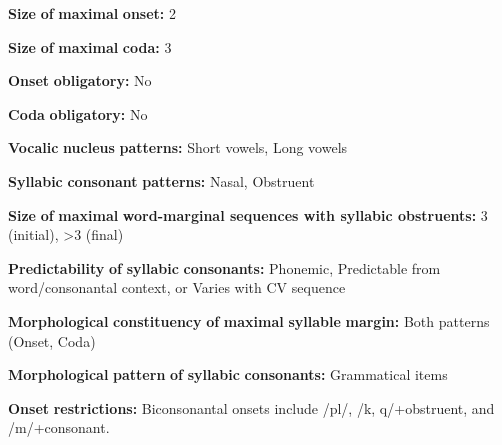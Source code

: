\documentclass[output=paper]{langsci/langscibook}
\begin{document}
\begin{styleBody}
\textbf{Size} \textbf{of} \textbf{maximal} \textbf{onset:} 2
\end{styleBody}

\begin{styleBody}
\textbf{Size} \textbf{of} \textbf{maximal} \textbf{coda:} 3
\end{styleBody}

\begin{styleBody}
\textbf{Onset} \textbf{obligatory:} No
\end{styleBody}

\begin{styleBody}
\textbf{Coda} \textbf{obligatory:} No
\end{styleBody}

\begin{styleBody}
\textbf{Vocalic} \textbf{nucleus} \textbf{patterns:} Short vowels, Long vowels
\end{styleBody}

\begin{styleBody}
\textbf{Syllabic} \textbf{consonant} \textbf{patterns:} Nasal, Obstruent
\end{styleBody}

\begin{styleBody}
\textbf{Size} \textbf{of} \textbf{maximal} \textbf{word{}-marginal sequences with syllabic obstruents:} 3 (initial), >3 (final)
\end{styleBody}

\begin{styleBody}
\textbf{Predictability} \textbf{of} \textbf{syllabic} \textbf{consonants:} Phonemic, Predictable from word/consonantal context, or Varies with CV sequence
\end{styleBody}

\begin{styleBody}
\textbf{Morphological} \textbf{constituency} \textbf{of} \textbf{maximal} \textbf{syllable} \textbf{margin:} Both patterns (Onset, Coda)
\end{styleBody}

\begin{styleBody}
\textbf{Morphological} \textbf{pattern} \textbf{of} \textbf{syllabic} \textbf{consonants:} Grammatical items
\end{styleBody}

\begin{styleBody}
\textbf{Onset} \textbf{restrictions:} Biconsonantal onsets include /pl/, /k, q/+obstruent, and /m/+consonant.
\end{styleBody}
\end{document}
